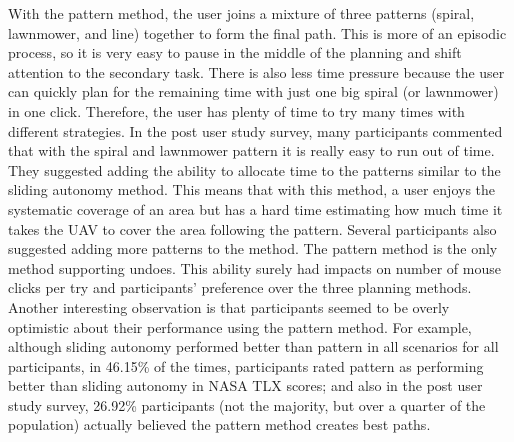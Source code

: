 \documentclass[journal]{IEEEtran}
\begin{document}
With the pattern method, the user joins a mixture of three patterns (spiral, lawnmower, and line) together to form the final path. This is more of an episodic process, so it is very easy to pause in the middle of the planning and shift attention to the secondary task. There is also less time pressure because the user can quickly plan for the remaining time with just one big spiral (or lawnmower) in one click. Therefore, the user has plenty of time to try many times with different strategies. In the post user study survey, many participants commented that with the spiral and lawnmower pattern it is really easy to run out of time. They suggested adding the ability to allocate time to the patterns similar to the sliding autonomy method. This means that with this method, a user enjoys the systematic coverage of an area but has a hard time estimating how much time it takes the UAV to cover the area following the pattern. Several participants also suggested adding more patterns to the method. The pattern method is the only method supporting undoes. This ability surely had impacts on number of mouse clicks per try and participants' preference over the three planning methods. Another interesting observation is that participants seemed to be overly optimistic about their performance using the pattern method. For example, although sliding autonomy performed better than pattern in all scenarios for all participants, in 46.15\% of the times, participants rated pattern as performing better than sliding autonomy in NASA TLX scores; and also in the post user study survey, 26.92\% participants (not the majority, but over a quarter of the population) actually believed the pattern method creates best paths.
\end{document}
